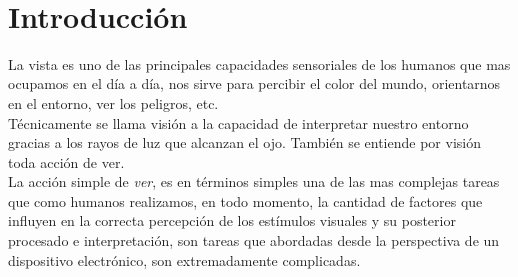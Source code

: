 \documentclass[12pt]{book} %
\begin{document}
\lhead[\thepage]{\rightmark}
\rhead[\leftmark]{\thepage}
\setcounter{tocdepth}{4}   %
\tableofcontents %

$\ $
\thispagestyle{empty} 
\setcounter{page}{1}			 

\chapter*{Introducción}
\lhead[\thepage]{}
\rhead[]{\thepage}

	La vista es uno de las principales capacidades sensoriales de los humanos que mas ocupamos en el día a día, 
	nos sirve para percibir el color del mundo, orientarnos en el entorno, ver los peligros, etc.\\
	Técnicamente se llama visión a la capacidad de interpretar nuestro entorno gracias a los rayos de luz que alcanzan
	el ojo. También se entiende por visión toda acción de ver.\\	
	La acción simple de \textit{ver}, es en términos simples una de las mas complejas tareas que como humanos realizamos, en
	todo momento, la cantidad de factores que influyen en la correcta percepción de los estímulos visuales y su posterior 
	procesado e interpretación, son tareas que abordadas desde la perspectiva de un dispositivo electrónico, son extremadamente
	complicadas.\\
	
\end{document}
